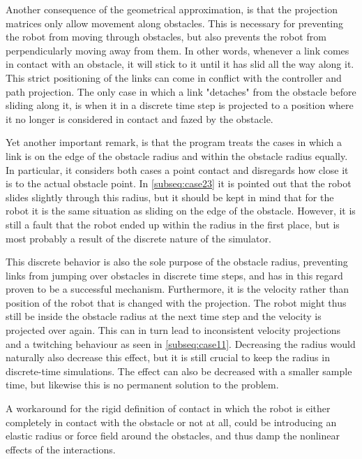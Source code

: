 Another consequence of the geometrical approximation, is that the projection matrices only allow movement along obstacles. This is necessary for preventing the robot from moving through obstacles, but also prevents the robot from perpendicularly moving away from them. In other words, whenever a link comes in contact with an obstacle, it will stick to it until it has slid all the way along it. This strict positioning of the links can come in conflict with the controller and path projection. The only case in which a link "detaches" from the obstacle before sliding along it, is when it in a discrete time step is projected to a position where it no longer is considered in contact and fazed by the obstacle.

Yet another important remark, is that the program treats the cases in which a link is on the edge of the obstacle radius and within the obstacle radius equally. In particular, it considers both cases a point contact and disregards how close it is to the actual obstacle point. In \ref{subseq:case23} it is pointed out that the robot slides slightly through this radius, but it should be kept in mind that for the robot it is the same situation as sliding on the edge of the obstacle. However, it is still a fault that the robot ended up within the radius in the first place, but is most probably a result of the discrete nature of the simulator.

This discrete behavior is also the sole purpose of the obstacle radius, preventing links from jumping over obstacles in discrete time steps, and has in this regard proven to be a successful mechanism.
Furthermore, it is the velocity rather than position of the robot that is changed with the projection. The robot might thus still be inside the obstacle radius at the next time step and the velocity is projected over again. This can in turn lead to inconsistent velocity projections and a twitching behaviour as seen in \ref{subseq:case11}.
Decreasing the radius would naturally also decrease this effect, but it is still crucial to keep the radius in discrete-time simulations. The effect can also be decreased with a smaller sample time, but likewise this is no permanent solution to the problem.

A workaround for the rigid definition of contact in which the robot is either completely in contact with the obstacle or not at all, could be introducing an elastic radius or force field around the obstacles, and thus damp the nonlinear effects of the interactions. %


